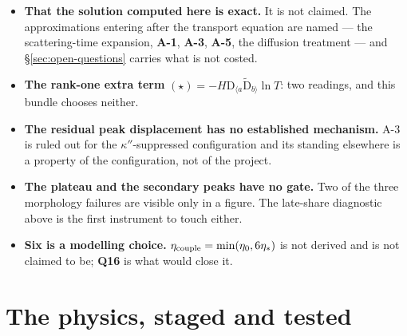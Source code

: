 \begin{itemize}\itemsep2pt
\item \textbf{That the solution computed here is exact.} It is not claimed. The
  approximations entering after the transport equation are named --- the
  scattering-time expansion, \textbf{A-1}, \textbf{A-3}, \textbf{A-5}, the
  diffusion treatment --- and \S\ref{sec:open-questions} carries what is not
  costed.
\item \textbf{The rank-one extra term} $(\star)=-H\mathrm D_{\langle
  a}\tilde{\mathrm D}_{b\rangle}\ln T$: two readings, and this bundle chooses
  neither.
\item \textbf{The residual peak displacement has no established mechanism.}
  A-3 is ruled out for the $\kappa''$-suppressed configuration and its standing
  elsewhere is a property of the configuration, not of the project.
\item \textbf{The plateau and the secondary peaks have no gate.} Two of the
  three morphology failures are visible only in a figure. The late-share
  diagnostic above is the first instrument to touch either.
\item \textbf{Six is a modelling choice.} $\eta_{\rm couple}=\min(\eta_0,
  6\eta_*)$ is not derived and is not claimed to be; \textbf{Q16} is what would
  close it.
\end{itemize}

\part{The physics, staged and tested}
\label{part:physics}
